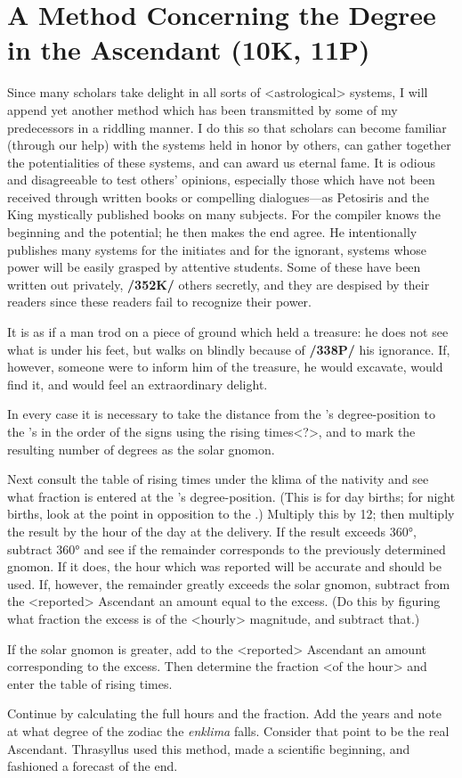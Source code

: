 \section{A Method Concerning the Degree in the Ascendant (10K, 11P)}

Since many scholars take delight in all sorts of <astrological> systems, I will append yet another method which has been transmitted by some of my predecessors in a riddling manner. I do this so that scholars can become familiar (through our help) with the systems held in honor by others, can gather together the potentialities of these systems, and can award us eternal fame. It is odious and disagreeable to test others’ opinions, especially those which have not been received through written books or compelling dialogues—as Petosiris and the King mystically published books on many subjects. For the compiler knows the beginning and the potential; he then makes the end agree. He intentionally publishes many systems for the initiates and for the ignorant, systems whose power will be easily grasped by attentive
students. Some of these have been written out privately, \textbf{/352K/} others secretly, and they are despised by their readers since these readers fail to recognize their power. 

It is as if a man trod on a piece of ground which held a treasure: he does not see what is under his feet, but walks on blindly because of \textbf{/338P/} his ignorance. If, however, someone were to inform him of the treasure, he would excavate, would find it, and would feel an extraordinary delight.

In every case it is necessary to take the distance from the \Sun’s degree-position to the \Moon’s in the order of the signs using the rising times<?>, and to mark the resulting number of degrees as the solar
gnomon. 

Next consult the table of rising times under the klima of the nativity and see what fraction is entered at the \Sun’s degree-position. (This is for day births; for night births, look at the point in opposition to the \Sun.) Multiply this by 12; then multiply the result by the hour of the day at the delivery. If the result exceeds 360°, subtract 360° and see if the remainder corresponds to the previously determined gnomon. If it does, the hour which was reported will be accurate and should be used. If,
however, the remainder greatly exceeds the solar gnomon, subtract from the <reported> Ascendant an amount equal to the excess. (Do this by figuring what fraction the excess is of the <hourly> magnitude,
and subtract that.) 

If the solar gnomon is greater, add to the <reported> Ascendant an amount corresponding to the excess. Then determine the fraction <of the hour> and enter the table of rising times. 

Continue by calculating the full hours and the fraction. Add the years and note at what degree of the zodiac the \textit{enklima} falls. Consider that point to be the real Ascendant. Thrasyllus used this method, made a scientific beginning, and fashioned a forecast of the end.

\newpage
